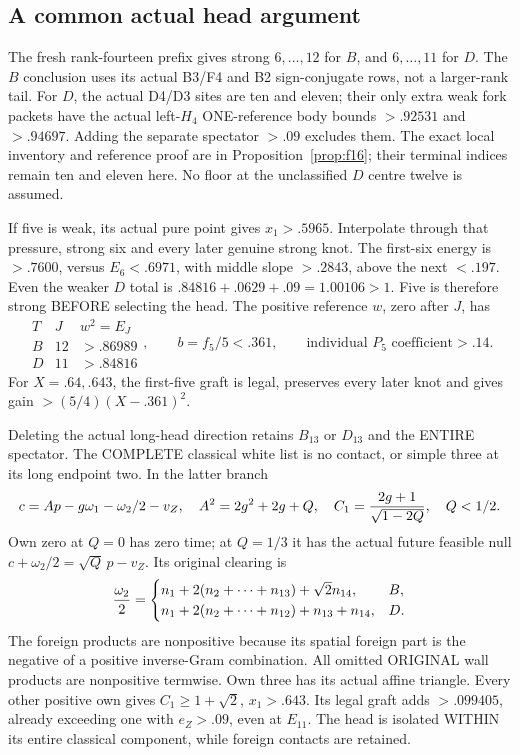 \documentclass[11pt]{article}
\begin{document}
\subsection{A common actual head argument}
\label{app:arithBD14typedhead}

The fresh rank-fourteen prefix gives strong
\(6,\ldots,12\) for \(B\), and \(6,\ldots,11\)
for \(D\).
The \(B\) conclusion uses its actual B3/F4 and
B2 sign-conjugate rows, not a larger-rank tail.
For \(D\), the actual D4/D3 sites are ten and eleven;
their only extra weak fork packets have the actual
left-\(H_4\) ONE-reference body bounds
\(>.92531\) and \(>.94697\).
Adding the separate spectator \(>.09\) excludes them.
The exact local inventory and reference proof are
in Proposition~\ref{prop:f16}; their terminal
indices remain ten and eleven here.
No floor at the unclassified \(D\) centre twelve
is assumed.

If five is weak, its actual pure point gives
\(x_1>.5965\).
Interpolate through that pressure, strong six and
every later genuine strong knot.
The first-six energy is \(>.7600\), versus \(E_6<.6971\),
with middle slope \(>.2843\), above the next \(<.197\).
Even the weaker \(D\) total is
\(.84816+.0629+.09=1.00106>1\).
Five is therefore strong BEFORE selecting the head.
The positive reference \(w\), zero after \(J\), has
\[
 \begin{array}{c|c|c}
 T&J&w^2=E_J\\ \hline
 B&12&>.86989\\
 D&11&>.84816
 \end{array},
 \qquad b=f_5/5<.361,\qquad
 \text{individual }P_5\text{ coefficient}>.14 .
\]
For \(X=.64,.643\), the first-five graft is legal,
preserves every later knot and gives gain
\(>(5/4)(X-.361)^2\).

Deleting the actual long-head direction retains
\(B_{13}\) or \(D_{13}\) and the ENTIRE spectator.
The COMPLETE classical white list is no contact,
or simple three at its long endpoint two.
In the latter branch
\[
 c=Ap-g\omega_1-\omega_2/2-v_Z,\quad
 A^2=2g^2+2g+Q,\quad
 C_1={2g+1\over\sqrt{1-2Q}},\quad Q<1/2 .
\]
Own zero at \(Q=0\) has zero time;
at \(Q=1/3\) it has the actual future feasible null
\(c+\omega_2/2=\sqrt Q\,p-v_Z\).
Its original clearing is
\[
 {\omega_2\over2}=
 \begin{cases}
 n_1+2(n_2+\cdots+n_{13})+\sqrt2n_{14},&B,\\
 n_1+2(n_2+\cdots+n_{12})+n_{13}+n_{14},&D .
 \end{cases}
\]
The foreign products are nonpositive because its
spatial foreign part is the negative of a positive
inverse-Gram combination.
All omitted ORIGINAL wall products are nonpositive
termwise.
Own three has its actual affine triangle.
Every other positive own gives
\(C_1\ge1+\sqrt2\), \(x_1>.643\).
Its legal graft adds \(>.099405\), already exceeding
one with \(e_Z>.09\), even at \(E_{11}\).
The head is isolated WITHIN its entire classical
component, while foreign contacts are retained.
\end{document}
